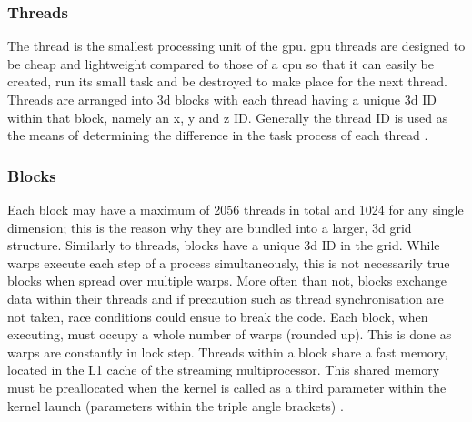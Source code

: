 \subsubsection{Threads}\label{gpu:ssec:thread}
The thread is the smallest processing unit of the \gls{gpu}. \gls{gpu} threads are designed to be cheap and lightweight compared to those of a \gls{cpu} so that it can easily be created, run its small task and be destroyed to make place for the next thread. Threads are arranged into \gls{3d} blocks with each thread having a unique \gls{3d} ID within that block, namely an x, y and z ID. Generally the thread ID is used as the means of determining the difference in the task process of each thread \citep{CUDA}.
%
\subsubsection{Blocks}\label{gpu:ssec:block}
Each block may have a maximum of 2056 threads in total and 1024 for any single dimension; this is the reason why they are bundled into a larger, \gls{3d} grid structure. Similarly to threads, blocks have a unique \gls{3d} ID in the grid. While warps execute each step of a process simultaneously, this is not necessarily true blocks when spread over multiple warps. More often than not, blocks exchange data within their threads and if precaution such as thread synchronisation are not taken, race conditions could ensue to break the code. Each block, when executing, must occupy a whole number of warps (rounded up). This is done as warps are constantly in lock step. Threads within a block share a fast memory, located in the L1 cache of the streaming multiprocessor. This shared memory must be preallocated when the kernel is called as a third parameter within the kernel launch (parameters within the triple angle brackets) \citep{CUDA}.
%
